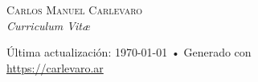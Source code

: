 \documentclass[10pt, a4paper]{article}
\begin{document}
% 
\thispagestyle{empty}
{\Large \textsc{Carlos Manuel Carlevaro}} \\ {\color{DimGrey}\textit{Curriculum Vit{\ae}}}

\hrulefill













% 

\vspace{1cm}
\vfill{}
\begin{center}
	{\scriptsize  Última actualización: \today\- •\-
		Generado con \href{http://es.wikipedia.org/wiki/LuaLaTeX}{\XeLaTeX} \\
		\href{https://carlevaro.ar}{https://carlevaro.ar}}
\end{center}
\end{document}
